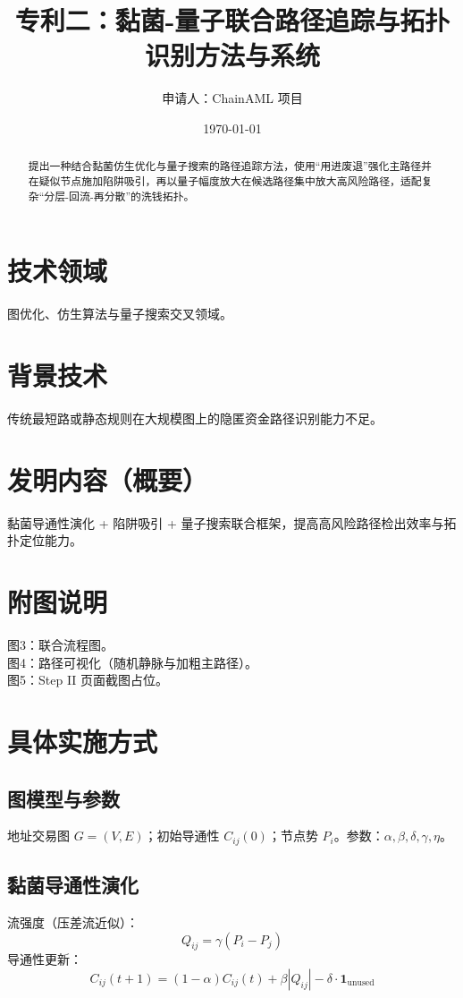 \documentclass[12pt]{article}
\title{专利二：黏菌-量子联合路径追踪与拓扑识别方法与系统}
\author{申请人：ChainAML 项目}
\date{\today}
\begin{document}
\maketitle

\begin{abstract}
提出一种结合黏菌仿生优化与量子搜索的路径追踪方法，使用“用进废退”强化主路径并在疑似节点施加陷阱吸引，再以量子幅度放大在候选路径集中放大高风险路径，适配复杂“分层-回流-再分散”的洗钱拓扑。
\end{abstract}

\section*{技术领域}
图优化、仿生算法与量子搜索交叉领域。

\section*{背景技术}
传统最短路或静态规则在大规模图上的隐匿资金路径识别能力不足。

\section*{发明内容（概要）}
黏菌导通性演化 + 陷阱吸引 + 量子搜索联合框架，提高高风险路径检出效率与拓扑定位能力。

\section*{附图说明}
图3：联合流程图。\\
图4：路径可视化（随机静脉与加粗主路径）。\\
图5：Step II 页面截图占位。

\section*{具体实施方式}
\subsection*{图模型与参数}
地址交易图 $G=(V,E)$；初始导通性 $C_{ij}(0)$；节点势 $P_i$。参数：$\alpha,\beta,\delta,\gamma,\eta$。

\subsection*{黏菌导通性演化}
流强度（压差流近似）：
\begin{equation}
Q_{ij}=\gamma (P_i-P_j)
\end{equation}
导通性更新：
\begin{equation}
C_{ij}(t+1)=(1-\alpha)C_{ij}(t)+\beta |Q_{ij}|-\delta\cdot \mathbf{1}_{\text{unused}}
\end{equation}
\end{document}
